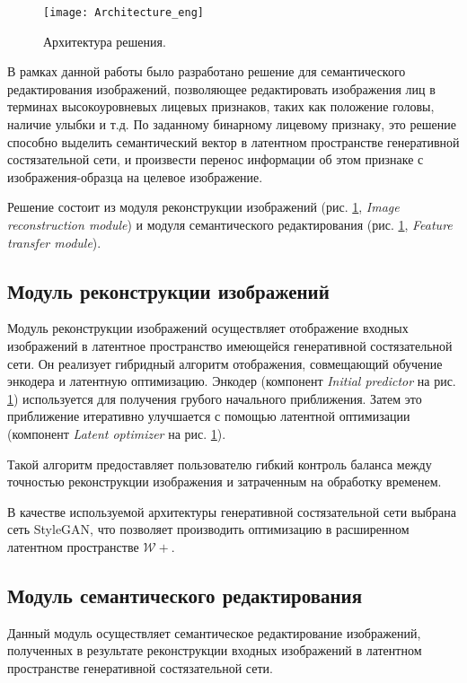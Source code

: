 
\begin{figure}[h]
\begin{center}
    \texttt{[image: Architecture\_eng]}
    \caption{Архитектура решения.}
    \label{fig:architecture}
\end{center}
\end{figure}


В рамках данной работы было разработано решение для семантического редактирования изображений, позволяющее редактировать изображения лиц в терминах высокоуровневых лицевых признаков, таких как положение головы, наличие улыбки и т.д.
По заданному бинарному лицевому признаку, это решение способно выделить семантический вектор в латентном пространстве генеративной состязательной сети, и произвести перенос информации об этом признаке с изображения-образца на целевое изображение.

Решение состоит из модуля реконструкции изображений (рис. \ref{fig:architecture}, \emph{Image reconstruction module}) и модуля семантического редактирования (рис. \ref{fig:architecture}, \emph{Feature transfer module}).

\subsection{Модуль реконструкции изображений}
Модуль реконструкции изображений осуществляет отображение входных изображений в латентное пространство имеющейся генеративной состязательной сети.
Он реализует гибридный алгоритм отображения, совмещающий обучение энкодера и латентную оптимизацию. 
Энкодер (компонент \emph{Initial predictor} на рис. \ref{fig:architecture}) используется для получения грубого начального приближения.
Затем это приближение итеративно улучшается с помощью латентной оптимизации (компонент \emph{Latent optimizer} на рис. \ref{fig:architecture}).

Такой алгоритм предоставляет пользователю гибкий контроль баланса между точностью реконструкции изображения и затраченным на обработку временем.

В качестве используемой архитектуры генеративной состязательной сети выбрана сеть StyleGAN, что позволяет производить оптимизацию в расширенном латентном пространстве $\mathcal W+$.

\subsection{Модуль семантического редактирования}
Данный модуль осуществляет семантическое редактирование изображений, полученных в результате реконструкции входных изображений в латентном пространстве генеративной состязательной сети. 

